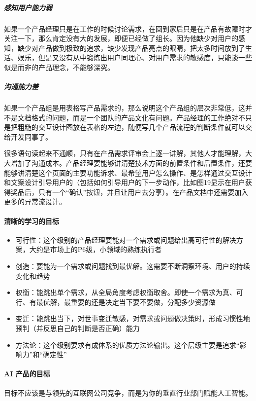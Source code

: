\documentclass[letterpaper,10pt,english]{sphinxmanual}
\begin{document}
\subparagraph{感知用户能力弱}
\label{\detokenize{chapter_idea/goal:id6}}
如果一个产品经理只是在工作的时候讨论需求，在回到家后只是在产品有故障时才关注一下，那么肯定没有大的发展，即便已经做了组长。因为他缺少对用户的感知，缺少对产品做到极致的追求，缺少发现产品亮点的眼睛，把太多时间放到了生活、娱乐，但是又没有从中锻炼出用户同理心、对用户需求的敏感度，只能谈一些似是而非的产品理念，不能够深究。


\subparagraph{沟通能力差}
\label{\detokenize{chapter_idea/goal:id7}}
如果一个产品组是用表格写产品需求的，那么说明这个产品组的层次非常低，这并不是文档格式的问题，而是一个团队的产品文化有问题。产品经理的工作绝对不只是把粗糙的交互设计图放在表格的左边，随便写几个产品流程的判断条件就可以交给开发同事了。

很多语句读起来不通顺，只有在产品需求评审会上逐一讲解，其他人才能理解，大大增加了沟通成本。产品经理要能够讲清楚技术方面的前置条件和后置条件，还要能够讲清楚这个页面的主要功能诉求、最希望用户怎么操作、是怎样通过交互设计和文案设计引导用户的（包括如何引导用户的下一步动作，比如图1\sphinxhyphen{}9显示在用户获得奖品后，只有一个“确认”按钮，并且让用户去分享）。在产品文档中还需要加入更多的异常流设计。


\paragraph{清晰的学习的目标}
\label{\detokenize{chapter_idea/goal:id8}}\begin{itemize}
\item {} 
可行性：这个级别的产品经理要能对一个需求或问题给出高可行性的解决方案，大约是市场上的P6级，小领域的熟练执行者

\item {} 
创造：要能为一个需求或问题找到最优解。这需要不断洞察环境、用户的持续变化和趋势

\item {} 
权衡：能跳出单个需求，从全局角度考虑权衡取舍。即使一个需求为真、可行、有最优解，最重要的还是决定当下要不要做，分配多少资源做

\item {} 
变迁：能跳出当下，对世事变迁敏感，对需求或问题做决策时，形成习惯性地预判（并反思自己的判断是否正确）能力

\item {} 
方法论：这个级别要求有成体系的优质方法论输出。这个层级主要是追求“影响力”和“确定性”

\end{itemize}


\paragraph{AI 产品的目标}
\label{\detokenize{chapter_idea/goal:ai}}
目标不应该是与领先的互联网公司竞争，而是为你的垂直行业部门赋能人工智能。
%
\begin{footnote}[424]\sphinxAtStartFootnote
{}
%
\end{footnote}
\end{document}
